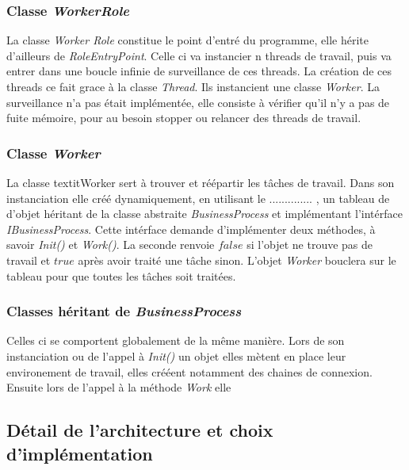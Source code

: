 \subsubsection{Classe \textit{WorkerRole}}
La classe \textit{Worker Role} constitue le point d'entré du
programme, elle hérite d'ailleurs de \textit{RoleEntryPoint}. Celle ci
va instancier n threads de travail, puis va entrer dans une boucle
infinie de surveillance de ces threads. La création de ces threads ce
fait grace à la classe \textit{Thread}. Ils instancient une classe
\textit{Worker}. La surveillance n'a pas était implémentée, elle
consiste à vérifier qu'il n'y a pas de fuite mémoire, pour au besoin
stopper ou relancer des threads de travail. 


\subsubsection{Classe \textit{Worker}}
La classe textit{Worker} sert à trouver et réépartir les tâches de
travail. Dans son instanciation elle créé dynamiquement, en utilisant
le .............. , un tableau de d'objet héritant de la classe
abstraite \textit{BusinessProcess} et implémentant l'intérface
\textit{IBusinessProcess}. Cette intérface demande d'implémenter deux
méthodes, à savoir \textit{Init()} et \textit{Work()}. La seconde
renvoie $false$ si l'objet ne trouve pas de travail et $true$ après
avoir traité une tâche sinon. L'objet \textit{Worker} bouclera sur le
tableau pour que toutes les tâches soit traitées.


\subsubsection{Classes héritant de \textit{BusinessProcess}}
Celles ci se comportent globalement de la même manière. Lors de son 
instanciation ou de l'appel à \textit{Init()} un objet  elles mètent en place
leur environement de travail, elles crééent notamment des chaines de
connexion. Ensuite lors de l'appel à la méthode \textit{Work} elle


\subsubsection{}
\subsubsection{}







%
%

\subsection{Détail de l'architecture et choix d'implémentation}
